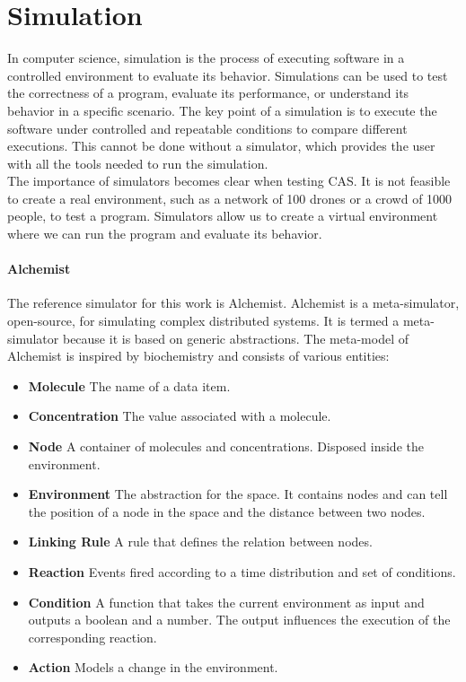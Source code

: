 \documentclass[12pt,a4paper,openright,twoside]{book}
\begin{document}
\section{Simulation}

In computer science, simulation is the process of executing software in a controlled environment to evaluate its behavior.
Simulations can be used to test the correctness of a program, evaluate its performance, or understand its behavior in a specific scenario.
The key point of a simulation is to execute the software under controlled and repeatable conditions to compare different executions. \cite{DBLP:journals/cacm/CollbergP16}
This cannot be done without a simulator, which provides the user with all the tools needed to run the simulation. \cite{argun2021simulation, bagrodia1998parsec} \\
The importance of simulators becomes clear when testing \ac{CAS}.
It is not feasible to create a real environment, such as a network of 100 drones or a crowd of 1000 people, to test a program.
Simulators allow us to create a virtual environment where we can run the program and evaluate its behavior.

\paragraph*{Alchemist}

The reference simulator for this work is Alchemist. \cite{Pianini_2013}
Alchemist is a meta-simulator, open-source, for simulating complex distributed systems. It is termed a meta-simulator because it is based on generic abstractions.
The meta-model of Alchemist is inspired by biochemistry and consists of various entities:
\begin{itemize}
  \item \textbf{Molecule} The name of a data item.
  \item \textbf{Concentration} The value associated with a molecule.
  \item \textbf{Node} A container of molecules and concentrations. Disposed inside the environment.
  \item \textbf{Environment} The abstraction for the space. It contains nodes and can tell the position of a node in the space and the distance between two nodes.
  \item \textbf{Linking Rule} A rule that defines the relation between nodes.
  \item \textbf{Reaction} Events fired according to a time distribution and set of conditions.
  \item \textbf{Condition} A function that takes the current environment as input and outputs a boolean and a number. The output influences the execution of the corresponding reaction.
  \item \textbf{Action} Models a change in the environment.
\end{itemize}
\end{document}
